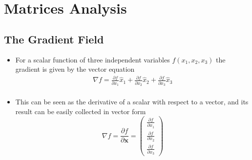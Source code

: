 \appendix

\chapter{Matrices Analysis}
\section{The Gradient Field}
\begin{itemize}
    \item For a scalar function of three independent variables $f(x_{1},x_{2},x_{3})$ the gradient is given by the vector equation
    \begin{equation}
        \begin{split}
            \nabla f = \frac{\partial f}{\partial x_{1}}{\hat {x}}_{1} + \frac{\partial f}{\partial x_{2}}{\hat {x}}_{2} + \frac{\partial f}{\partial x_{3}}{\hat {x}}_{3}\\
        \end{split}
    \end{equation}
    \item This can be seen as the derivative of a scalar with respect to a vector, and its result can be easily collected in vector form
    \begin{equation}
        \nabla f = \frac{\partial f}{\partial\mathbf{x}} = 
        \left(
        \begin{array}{c}
            \frac{\partial f}{\partial x_{1}} \\ 
            \frac{\partial f}{\partial x_{2}} \\ 
            \frac{\partial f}{\partial x_{3}}
        \end{array}
        \right)
    \end{equation}
\end{itemize}            


